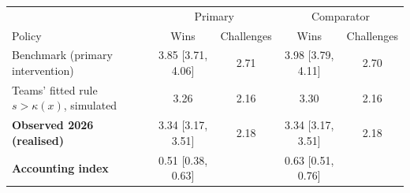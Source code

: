\begin{tabular}{p{3.9cm}cccc}
\toprule
 & \multicolumn{2}{c}{Primary} & \multicolumn{2}{c}{Comparator} \\
Policy & Wins & Challenges & Wins & Challenges \\
\midrule
Benchmark (primary intervention) & 3.85 [3.71, 4.06] & 2.71 & 3.98 [3.79, 4.11] & 2.70 \\
Teams' fitted rule $s>\kappa(x)$, simulated & 3.26 & 2.16 & 3.30 & 2.16 \\
\textbf{Observed 2026 (realised)} & 3.34 [3.17, 3.51] & 2.18 & 3.34 [3.17, 3.51] & 2.18 \\
\midrule
\textbf{Accounting index} & 0.51 [0.38, 0.63] & & 0.63 [0.51, 0.76] & \\
\bottomrule
\end{tabular}
